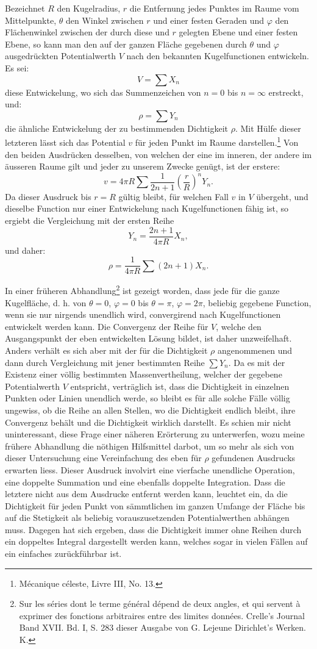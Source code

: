 \documentclass[11pt]{article}
\begin{document}
Bezeichnet $R$ den Kugelradius, $r$ die Entfernung jedes Punktes im Raume vom Mittelpunkte, $\theta$ den Winkel zwischen $r$ und einer festen Geraden und $\varphi$ den Flächenwinkel zwischen der durch diese und $r$ gelegten Ebene und einer festen Ebene, so kann man den auf der ganzen Fläche gegebenen durch $\theta$ und $\varphi$ ausgedrückten Potentialwerth $V$ nach den bekannten Kugelfunctionen entwickeln. Es sei:
\[
  V=\sum X_n
\]
diese Entwickelung, wo sich das Summenzeichen von $n=0$ bis $n=\infty$ erstreckt, und:
\[
  \rho=\sum Y_n
\]
die ähnliche Entwickelung der zu bestimmenden Dichtigkeit $\rho$. Mit Hülfe dieser letzteren lässt sich das Potential $v$ für jeden Punkt im Raume darstellen.\footnote{Mécanique céleste, Livre III, No. 13.} Von den beiden Ausdrücken desselben, von welchen der eine im inneren, der andere im äusseren Raume gilt und jeder zu unserem Zwecke genügt, ist der erstere:
\[
 v=4\pi R\sum \frac{1}{2n+1}\left(\frac rR\right)^n Y_n.
\]
Da dieser Ausdruck bis $r=R$ gültig bleibt, für welchen Fall $v$ in $V$ übergeht, und dieselbe Function nur einer Entwickelung nach Kugelfunctionen fähig ist, so ergiebt die Vergleichung mit der ersten Reihe
\[
  Y_n=\frac{2n+1}{4\pi R}X_n,
\]
und daher:
\[
  \rho=\frac{1}{4\pi R}\sum(2n+1)X_n.
\]

In einer früheren Abhandlung\footnote{Sur les séries dont le terme général dépend de deux angles, et qui servent à exprimer des fonctions arbitraires entre des limites données. Crelle's Journal Band XVII. Bd. I, S. 283 dieser Ausgabe von G. Lejeune Dirichlet's Werken. K.} ist gezeigt worden, dass jede für die ganze Kugelfläche, d. h. von $\theta=0$, $\varphi=0$ bis $\theta=\pi$, $\varphi=2\pi$, beliebig gegebene Function, wenn sie nur nirgends unendlich wird, convergirend nach Kugelfunctionen entwickelt werden kann. Die Convergenz der Reihe für $V$, welche den Ausgangspunkt der eben entwickelten Lösung bildet, ist daher unzweifelhaft. Anders verhält es sich aber mit der für die Dichtigkeit $\rho$ angenommenen und dann durch Vergleichung mit jener bestimmten Reihe $\sum Y_n$. Da es mit der Existenz einer völlig bestimmten Massenvertheilung, welcher der gegebene Potentialwerth $V$ entspricht, verträglich ist, dass die Dichtigkeit in einzelnen Punkten oder Linien unendlich werde, so bleibt es für alle solche Fälle völlig ungewiss, ob die Reihe an allen Stellen, wo die Dichtigkeit endlich bleibt, ihre Convergenz behält und die Dichtigkeit wirklich darstellt. Es schien mir nicht uninteressant, diese Frage einer näheren Erörterung zu unterwerfen, wozu meine frühere Abhandlung die nöthigen Hilfsmittel darbot, um so mehr als sich von dieser Untersuchung eine Vereinfachung des eben für $\rho$ gefundenen Ausdrucks erwarten liess. Dieser Ausdruck involvirt eine vierfache unendliche Operation, eine doppelte Summation und eine ebenfalls doppelte Integration. Dass die letztere nicht aus dem Ausdrucke entfernt werden kann, leuchtet ein, da die Dichtigkeit für jeden Punkt von sämmtlichen im ganzen Umfange der Fläche bis auf die Stetigkeit als beliebig vorauszusetzenden Potentialwerthen abhängen muss. Dagegen hat sich ergeben, dass die Dichtigkeit immer ohne Reihen durch ein doppeltes Integral dargestellt werden kann, welches sogar in vielen Fällen auf ein einfaches zurückführbar ist.
\end{document}
